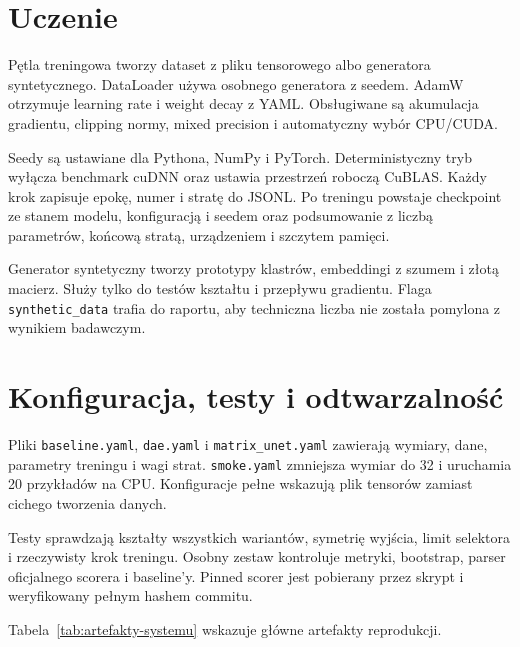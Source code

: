 \section{Uczenie}
\label{sec:uczenie-systemu}

Pętla treningowa tworzy dataset z pliku tensorowego albo generatora syntetycznego. DataLoader używa osobnego generatora z seedem. AdamW otrzymuje learning rate i weight decay z YAML. Obsługiwane są akumulacja gradientu, clipping normy, mixed precision i automatyczny wybór CPU/CUDA.

Seedy są ustawiane dla Pythona, NumPy i PyTorch. Deterministyczny tryb wyłącza benchmark cuDNN oraz ustawia przestrzeń roboczą CuBLAS. Każdy krok zapisuje epokę, numer i stratę do JSONL. Po treningu powstaje checkpoint ze stanem modelu, konfiguracją i seedem oraz podsumowanie z liczbą parametrów, końcową stratą, urządzeniem i szczytem pamięci.

Generator syntetyczny tworzy prototypy klastrów, embeddingi z szumem i złotą macierz. Służy tylko do testów kształtu i przepływu gradientu. Flaga \texttt{synthetic\_data} trafia do raportu, aby techniczna liczba nie została pomylona z wynikiem badawczym.

\section{Konfiguracja, testy i odtwarzalność}
\label{sec:odtwarzalnosc-systemu}

Pliki \texttt{baseline.yaml}, \texttt{dae.yaml} i \texttt{matrix\_unet.yaml} zawierają wymiary, dane, parametry treningu i wagi strat. \texttt{smoke.yaml} zmniejsza wymiar do 32 i uruchamia 20 przykładów na CPU. Konfiguracje pełne wskazują plik tensorów zamiast cichego tworzenia danych.

Testy sprawdzają kształty wszystkich wariantów, symetrię wyjścia, limit selektora i rzeczywisty krok treningu. Osobny zestaw kontroluje metryki, bootstrap, parser oficjalnego scorera i baseline’y. Pinned scorer jest pobierany przez skrypt i weryfikowany pełnym hashem commitu.

Tabela~\ref{tab:artefakty-systemu} wskazuje główne artefakty reprodukcji.

